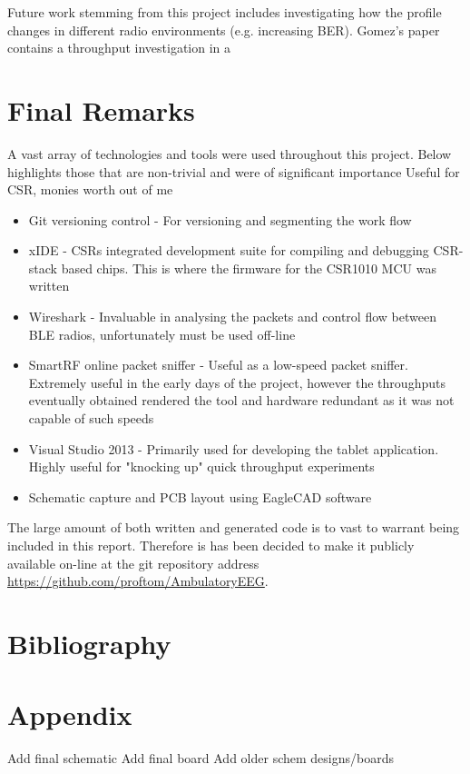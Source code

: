 \documentclass[]{article}
\begin{document}
Future work stemming from this project includes investigating how the profile changes in different radio environments (e.g. increasing \ac{BER}). Gomez's\cite{Gomez2011} paper contains a throughput investigation in a 

\section{Final Remarks}
A vast array of technologies and tools were used throughout this project. Below highlights those that are non-trivial and were of significant importance
Useful for CSR, monies worth out of me

\begin{itemize}
	\item Git versioning control - For versioning and segmenting the work flow
	\item xIDE - CSRs integrated development suite for compiling and debugging CSR-stack based chips. This is where the firmware for the CSR1010 MCU was written
	\item Wireshark - Invaluable in analysing the packets and control flow between BLE radios, unfortunately must be used off-line
	\item SmartRF online packet sniffer - Useful as a low-speed packet sniffer. Extremely useful in the early days of the project, however the throughputs eventually obtained rendered the tool and hardware redundant as it was not capable of such speeds
	\item Visual Studio 2013 - Primarily used for developing the tablet application. Highly useful for "knocking up" quick throughput experiments 
	\item Schematic capture and \ac{PCB} layout using EagleCAD software
\end{itemize}

The large amount of both written and generated code is to vast to warrant being included in this report. Therefore is has been decided to make it publicly available on-line at the git repository address 
\url{https://github.com/proftom/AmbulatoryEEG}.
\clearpage
\section{Bibliography}

\nocite{*}

\printbibliography

\section{Appendix}
Add final schematic
Add final board
Add older schem designs/boards
\end{document}
